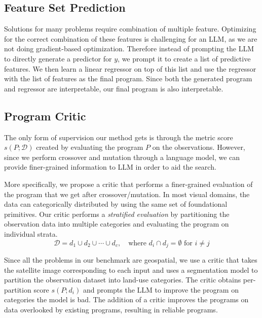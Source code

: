 \subsection{Feature Set Prediction}
\label{ssec:setpred}
Solutions for many problems require combination of multiple feature. 
Optimizing for the correct combination of these features is challenging for an LLM, as we are not doing gradient-based optimization.
Therefore instead of prompting the LLM to directly generate a predictor for $y$, we prompt it to create a list of predictive features. 
We then learn a linear regressor on top of this list and use the regressor with the list of features as the final program. 
Since both the generated program and regressor are interpretable, our final program is also interpretable.

\subsection{Program Critic}\label{ssec:critic}
The only form of supervision our method gets is through the metric score $s(P;\mathcal{D})$ created by evaluating the program $P$ on the observations. 
However, since we perform crossover and mutation through a language model, we can provide finer-grained information to LLM in order to aid the search.

More specifically, we propose a critic that performs a finer-grained evaluation of the program that we get after crossover/mutation.
In most visual domains, the data can categorically distributed by using the same set of foundational primitives.
Our critic performs a \emph{stratified evaluation} by partitioning the observation data into multiple categories and evaluating the program on individual strata.
\begin{equation}
\mathcal{D} = d_1 \cup d_2 \cup \cdots \cup d_c, \quad \text{where } d_i \cap d_j = \emptyset \text{ for } i \neq j    
\end{equation}

Since all the problems in our benchmark are geospatial, we use a critic that takes the satellite image corresponding to each input and uses a segmentation model to partition the observation dataset into land-use categories. 
The critic obtains per-partition score $s(P; d_i)$ and prompts the LLM to improve the program on categories the model is bad. The addition of a critic improves the programs on data overlooked by existing programs, resulting in reliable programs.

